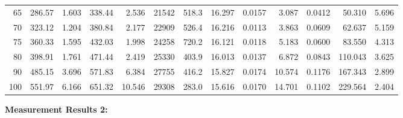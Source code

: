 \documentclass[10pt]{article}
\begin{document}
{\begin{tabular}{|r|rr|rr|rr|rr|rr|r|r|}
       65 &       286.57 &        1.603 &       338.44 &        2.536 &        21542 &        518.3 &       16.297 &       0.0157 &        3.087 &       0.0412 &       50.310 &        5.696 \\
       70 &       323.12 &        1.204 &       380.84 &        2.177 &        22909 &        526.4 &       16.216 &       0.0113 &        3.863 &       0.0609 &       62.637 &        5.159 \\
       75 &       360.33 &        1.595 &       432.03 &        1.998 &        24258 &        720.2 &       16.121 &       0.0118 &        5.183 &       0.0600 &       83.550 &        4.313 \\
       80 &       398.91 &        1.761 &       471.44 &        2.419 &        25330 &        403.9 &       16.013 &       0.0137 &        6.872 &       0.0843 &      110.043 &        3.625 \\
       90 &       485.15 &        3.696 &       571.83 &        6.384 &        27755 &        416.2 &       15.827 &       0.0174 &       10.574 &       0.1176 &      167.343 &        2.899 \\
      100 &       551.97 &        6.166 &       651.32 &       10.546 &        29308 &        283.0 &       15.616 &       0.0170 &       14.701 &       0.1102 &      229.564 &        2.404 \\
\hline
\end{tabular}
}

\vspace{3mm}

\noindent
{\large \bf Measurement Results 2:}
\vspace{3mm}
\end{document}
